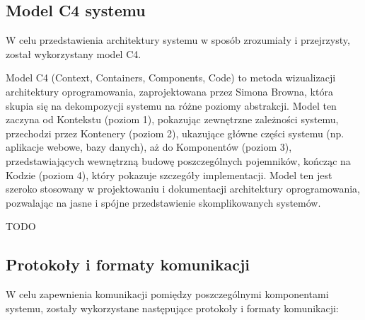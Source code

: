 \subsection{Model C4 systemu}

W celu przedstawienia architektury systemu w sposób zrozumiały i przejrzysty, został wykorzystany model C4.

Model C4 (Context, Containers, Components, Code) to metoda wizualizacji architektury oprogramowania, zaprojektowana przez Simona Browna, która skupia się na dekompozycji systemu na różne poziomy abstrakcji. Model ten zaczyna od Kontekstu (poziom 1), pokazując zewnętrzne zależności systemu, przechodzi przez Kontenery (poziom 2), ukazujące główne części systemu (np. aplikacje webowe, bazy danych), aż do Komponentów (poziom 3), przedstawiających wewnętrzną budowę poszczególnych pojemników, kończąc na Kodzie (poziom 4), który pokazuje szczegóły implementacji. Model ten jest szeroko stosowany w projektowaniu i dokumentacji architektury oprogramowania, pozwalając na jasne i spójne przedstawienie skomplikowanych systemów.

TODO

\subsection{Protokoły i formaty komunikacji}

W celu zapewnienia komunikacji pomiędzy poszczególnymi komponentami systemu, zostały wykorzystane następujące protokoły i formaty komunikacji:

